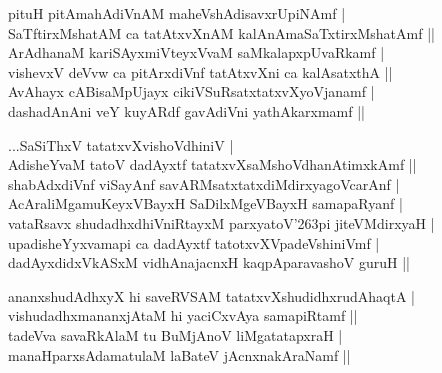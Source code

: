 \begin{entry}
\begin{shl}
pituH pitAmahAdiVnAM maheVshAdisavxrUpiNAmf |\\[1pt]
SaTftirxMshatAM ca tatAtxvXnAM kalAnAmaSaTxtirxMshatAmf ||\\[1pt]
ArAdhanaM kariSAyxmiVteyxVvaM saMkalapxpUvaRkamf |\\[1pt]
vishevxV deVvw ca pitArxdiVnf tatAtxvXni ca kalAsatxthA ||\\[1pt]
AvAhayx cABisaMpUjayx cikiVSuRsatxtatxvXyoVjanamf |\\[1pt]
dashadAnAni veY kuyARdf gavAdiVni yathAkarxmamf ||
\end{shl}
\medskip
{}
\end{entry}

\begin{entry}
\smallskip
\begin{shl}
...SaSiThxV tatatxvXvishoVdhiniV |\\[1pt]
AdisheYvaM tatoV dadAyxtf tatatxvXsaMshoVdhanAtimxkAmf ||\\[1pt]
shabAdxdiVnf viSayAnf savARMsatxtatxdiMdirxyagoVcarAnf |\\[1pt]
AcAraliMgamuKeyxVBayxH SaDilxMgeVBayxH samapaRyanf |\\[1pt]
vataRsavx shudadhxdhiVniRtayxM parxyatoV{\char'263}pi jiteVMdirxyaH |\\[1pt]
upadisheYyxvamapi ca dadAyxtf tatotxvXVpadeVshiniVmf |\\[1pt]
dadAyxdidxVkASxM vidhAnajacnxH kaqpAparavashoV guruH ||
\end{shl}
\medskip
{}
\end{entry}

\begin{entry}
\smallskip
\begin{shl}
ananxshudAdhxyX hi saveRVSAM tatatxvXshudidhxrudAhaqtA |\\[1pt]
vishudadhxmananxjAtaM hi yaciCxvAya samapiRtamf ||\\[1pt]
tadeVva savaRkAlaM tu BuMjAnoV liMgatatapxraH |\\[1pt]
manaHparxsAdamatulaM laBateV jAcnxnakAraNamf ||
\end{shl}
\medskip
{}
\end{entry}

